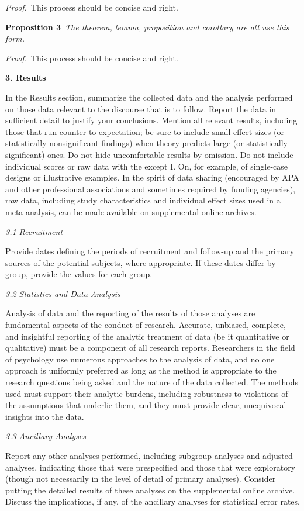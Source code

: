 \documentclass[twoside,10.5pt]{article}%
\begin{document}
\emph{Proof.}~This process should be concise and right.  

\textbf{Proposition 3}~\emph{The theorem, lemma, proposition and corollary are all use this form.}

\emph{Proof.}~This process should be concise and right. 

\textbf{3. Results}

In the Results section, summarize the collected data and the analysis performed on those data relevant to the discourse that is to follow. Report the data in sufficient detail to justify your conclusions. Mention all relevant results, including those that run counter to expectation; be sure to include small effect sizes (or statistically nonsignificant findings) when theory predicts large (or statistically significant) ones. Do not hide uncomfortable results
by omission. Do not include individual scores or raw data with the except I. On, for example, of single-case designs or illustrative examples. In the spirit of data sharing (encouraged by APA and other professional associations and sometimes required by funding agencies), raw data, including study characteristics and individual effect sizes used in a meta-analysis, can be made available on supplemental online archives.

\emph{3.1 Recruitment}

Provide dates defining the periods of recruitment and follow-up and the primary sources of the potential subjects, where appropriate. If these dates differ by group, provide the values for each group.

\emph{3.2 Statistics and Data Analysis}

Analysis of data and the reporting of the results of those analyses are fundamental aspects of the conduct of research. Accurate, unbiased, complete, and insightful reporting of the analytic treatment of data (be it quantitative or qualitative) must be a component of all research reports. Researchers in the field of psychology use numerous approaches to the analysis of data, and no one approach is uniformly preferred as long as the method is appropriate to the research questions being asked and the nature of the data collected. The methods used must support their analytic burdens, including robustness to violations of the assumptions that underlie them, and they must provide clear, unequivocal insights into the data.

\emph{3.3 Ancillary Analyses}

Report any other analyses performed, including subgroup analyses and adjusted analyses, indicating those that were prespecified and those that were exploratory (though not necessarily in the level of detail of primary analyses). Consider putting the detailed results of these analyses on the supplemental online archive. Discuss the implications, if any, of the ancillary analyses for statistical error rates.
\end{document}
